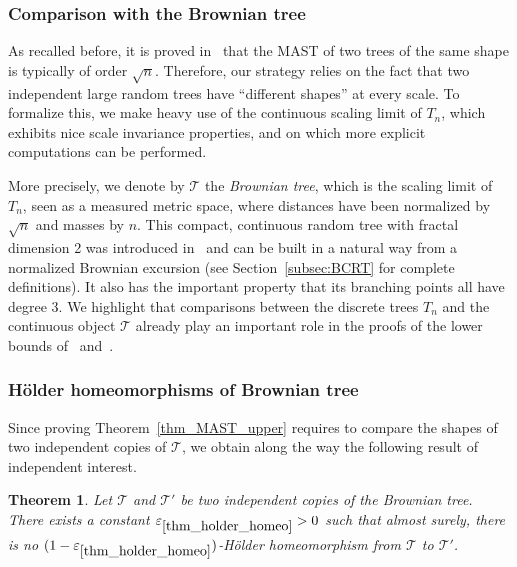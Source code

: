 \documentclass[JEP,XML,SOM,Unicode,NoFloatCountersInSection,published]{cedram}
\newcommand{\Tt}{\mathcal{T}}
\let\eps\varepsilon
\theoremstyle{plain}
\newtheorem{theorem}{Theorem}
\theoremstyle{definition}
\begin{document}
\subsubsection*{Comparison with the Brownian tree}
As recalled before, it is proved in~\cite{misra_bounds_2019} that the MAST of two trees of the same shape is typically of order $\sqrt{n}$.
Therefore, our strategy relies on the fact that two independent large random trees have ``different shapes'' at every scale.
To formalize this, we make heavy use of the continuous scaling limit of $T_n$, which exhibits nice scale invariance properties, and on which more explicit computations can be performed.

More precisely, we denote by $\Tt$ the \emph{Brownian tree}, which is the scaling limit of~$T_n$, seen as a measured metric space, where distances have been normalized by $\sqrt{n}$ and masses by $n$.
This compact, continuous random tree with fractal dimension 2 was introduced in~\cite{Ald91} and can be built in a natural way from a normalized Brownian excursion (see Section~\ref{subsec:BCRT} for complete definitions). It also has the important property that its branching points all have degree $3$. We highlight that comparisons between the discrete trees $T_n$ and the continuous object $\Tt$ already play an important role in the proofs of the lower bounds of~\cite{aldous_largest_2022} and~\cite{Khez22}.

\subsubsection*{Hölder homeomorphisms of Brownian tree}
Since proving Theorem~\ref{thm_MAST_upper} requires to compare the shapes of two independent copies of $\Tt$, we obtain along the way the following result of independent interest.

\begin{theorem}\label{thm_holder_homeo}
Let $\Tt$ and $\Tt'$ be two independent copies of the Brownian tree. There exists a constant $\eps_{\ref{thm_holder_homeo}}>0$ such that almost surely, there is no $(1-\eps_{\ref{thm_holder_homeo}})$-Hölder homeomorphism from $\Tt$ to $\Tt'$.
\end{theorem}
\end{document}
